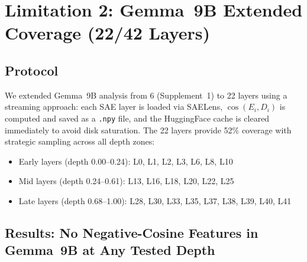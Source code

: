 \documentclass[11pt,a4paper]{article}
\newcommand{\cosED}{\cos(E_i, D_i)}
\begin{document}
\section{Limitation 2: Gemma~9B Extended Coverage (22/42 Layers)}
\label{sec:gemma9b}

\subsection{Protocol}

We extended Gemma~9B analysis from 6 (Supplement~1) to 22 layers using a streaming approach: each SAE layer is loaded via SAELens, $\cosED$ is computed and saved as a \texttt{.npy} file, and the HuggingFace cache is cleared immediately to avoid disk saturation. The 22 layers provide 52\% coverage with strategic sampling across all depth zones:
\begin{itemize}[nosep]
  \item Early layers (depth 0.00--0.24): L0, L1, L2, L3, L6, L8, L10
  \item Mid layers (depth 0.24--0.61): L13, L16, L18, L20, L22, L25
  \item Late layers (depth 0.68--1.00): L28, L30, L33, L35, L37, L38, L39, L40, L41
\end{itemize}

\subsection{Results: No Negative-Cosine Features in Gemma~9B at Any Tested Depth}
\end{document}
